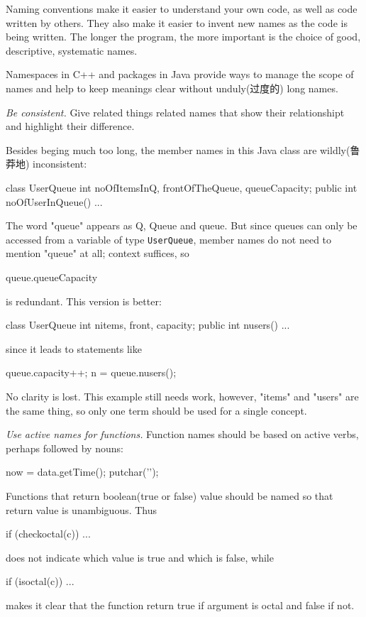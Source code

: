 Naming conventions make it easier to understand your own code, as well as
code written by others. They also make it easier to invent new names as the
code is being written. The longer the program, the more important is the
choice of good, descriptive, systematic names.

Namespaces in C++ and packages in Java provide ways to manage the scope of
names and help to keep meanings clear without unduly(过度的) long names.

\emph{Be consistent.} Give related things related names that show their
relationshipt and highlight their difference.

Besides beging much too long, the member names in this Java class are
wildly(鲁莽地) inconsistent:
\begin{badcode}
    class UserQueue {
        int noOfItemsInQ, frontOfTheQueue, queueCapacity;
        public int noOfUserInQueue() { ... }
    }
\end{badcode}
The word "queue" appears as Q, Queue and queue. But since queues can only
be accessed from a variable of type \verb"UserQueue", member names do not
need to mention "queue" at all; context suffices, so 
\begin{badcode}
    queue.queueCapacity
\end{badcode}
is redundant. This version is better:
\begin{wellcode}
    class UserQueue {
        int nitems, front, capacity;
        public int nusers() { ... }
    }
\end{wellcode}
since it leads to statements like 
\begin{wellcode}
    queue.capacity++;
    n = queue.nusers();
\end{wellcode}
No clarity is lost. This example still needs work, however, "items" and
"users" are the same thing, so only one term should be used for a single
concept.

\emph{Use active names for functions.} Function names should be based on
active verbs, perhaps followed by nouns:
\begin{wellcode}
    now = data.getTime();
    putchar('\n');
\end{wellcode}
Functions that return boolean(true or false) value should be named so that
return value is unambiguous. Thus
\begin{badcode}
    if (checkoctal(c)) ...
\end{badcode}
does not indicate which value is true and which is false, while 
\begin{wellcode}
    if (isoctal(c)) ...
\end{wellcode}
makes it clear that the function return true if argument is octal and false
if not.

